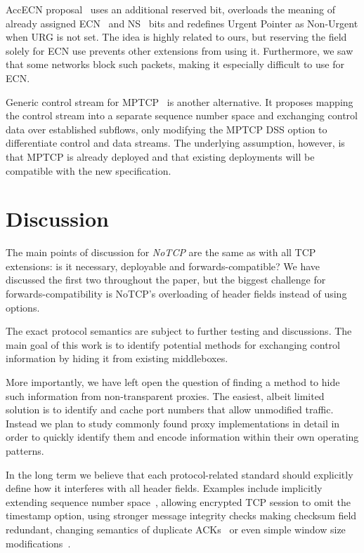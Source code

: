 \documentclass{sig-alternate-10pt}
\begin{document}
AccECN proposal~\cite{Kuhlewind:2014vd} uses an additional reserved bit, overloads the meaning of already assigned ECN~\cite{Floyd:up} and NS~\cite{Ely:uc} bits and redefines Urgent Pointer as Non-Urgent when URG is not set. The idea is highly related to ours, but reserving the field solely for ECN use prevents other extensions from using it. Furthermore, we saw that some networks block such packets, making it especially difficult to use for ECN.

Generic control stream for MPTCP~\cite{Bonaventure:wx} is another alternative. It proposes mapping the control stream into a separate sequence number space and exchanging control data over established subflows, only modifying the MPTCP DSS option to differentiate control and data streams. The underlying assumption, however, is that MPTCP is already deployed and that existing deployments will be compatible with the new specification.

\section{Discussion}

The main points of discussion for \emph{NoTCP} are the same as with all TCP extensions: is it necessary, deployable and forwards-compatible? We have discussed the first two throughout the paper, but the biggest challenge for forwards-compatibility is NoTCP's overloading of header fields instead of using options.

The exact protocol semantics are subject to further testing and discussions. The main goal of this work is to identify potential methods for exchanging control information by hiding it from existing middleboxes.

More importantly, we have left open the question of finding a method to hide such information from non-transparent proxies. The easiest, albeit limited solution is to identify and cache port numbers that allow unmodified traffic. Instead we plan to study commonly found proxy implementations in detail in order to quickly identify them and encode information within their own operating patterns.

In the long term we believe that each protocol-related standard should explicitly define how it interferes with all header fields. Examples include implicitly extending sequence number space~\cite{Mazieres:uz}, allowing encrypted TCP session to omit the timestamp option, using stronger message integrity checks making checksum field redundant, changing semantics of duplicate ACKs~\cite{Handley:vj,Flach:2013uy} or even simple window size modifications~\cite{Crowcroft:1998dk}.
\end{document}
